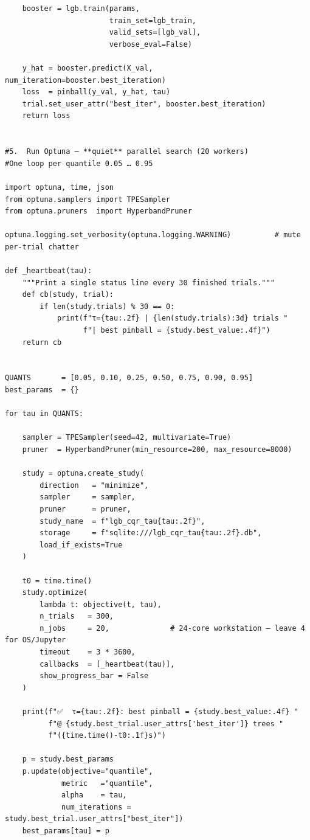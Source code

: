 \documentclass[
  a4paper,
  DIV=11,
  numbers=noendperiod]{scrreprt}
\begin{document}
\begin{verbatim}
    booster = lgb.train(params,
                        train_set=lgb_train,
                        valid_sets=[lgb_val],
                        verbose_eval=False)

    y_hat = booster.predict(X_val, num_iteration=booster.best_iteration)
    loss  = pinball(y_val, y_hat, tau)
    trial.set_user_attr("best_iter", booster.best_iteration)
    return loss


#5.  Run Optuna – **quiet** parallel search (20 workers)
#One loop per quantile 0.05 … 0.95

import optuna, time, json
from optuna.samplers import TPESampler
from optuna.pruners  import HyperbandPruner

optuna.logging.set_verbosity(optuna.logging.WARNING)          # mute per-trial chatter

def _heartbeat(tau):
    """Print a single status line every 30 finished trials."""
    def cb(study, trial):
        if len(study.trials) % 30 == 0:
            print(f"τ={tau:.2f} | {len(study.trials):3d} trials "
                  f"| best pinball = {study.best_value:.4f}")
    return cb


QUANTS       = [0.05, 0.10, 0.25, 0.50, 0.75, 0.90, 0.95]
best_params  = {}

for tau in QUANTS:
    
    sampler = TPESampler(seed=42, multivariate=True)
    pruner  = HyperbandPruner(min_resource=200, max_resource=8000)

    study = optuna.create_study(
        direction   = "minimize",
        sampler     = sampler,
        pruner      = pruner,
        study_name  = f"lgb_cqr_tau{tau:.2f}",
        storage     = f"sqlite:///lgb_cqr_tau{tau:.2f}.db",
        load_if_exists=True
    )

    t0 = time.time()
    study.optimize(
        lambda t: objective(t, tau),
        n_trials   = 300,
        n_jobs     = 20,              # 24-core workstation – leave 4 for OS/Jupyter
        timeout    = 3 * 3600,
        callbacks  = [_heartbeat(tau)],
        show_progress_bar = False
    )

    print(f"✅  τ={tau:.2f}: best pinball = {study.best_value:.4f} "
          f"@ {study.best_trial.user_attrs['best_iter']} trees "
          f"({time.time()-t0:.1f}s)")

    p = study.best_params
    p.update(objective="quantile",
             metric   ="quantile",
             alpha    = tau,
             num_iterations = study.best_trial.user_attrs["best_iter"])
    best_params[tau] = p


\end{verbatim}
\end{document}
